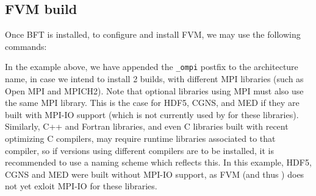 \documentclass[a4paper,10pt,twoside]{article}
\begin{document}
\subsection{FVM build\label{sec:fvm:config:examples}}

Once BFT is installed, to configure and install FVM, we may use the
following commands:


In the example above, we have appended the \texttt{\_ompi} postfix
to the architecture name, in case we intend to install 2 builds,
with different MPI libraries (such as Open MPI and MPICH2).
Note that optional libraries using MPI must also use the same MPI
library. This is the case for HDF5, CGNS, and MED if they are built
with MPI-IO support (which is not currently used by \CS for these libraries).
Similarly, C++ and Fortran libraries, and even C libraries built with recent
optimizing C compilers, may require runtime libraries associated to that
compiler, so if versions using different compilers are to be installed, it is
recommended to use a naming scheme which reflects this.
In this example, HDF5, CGNS and MED were built without MPI-IO support,
as FVM (and thus \CS) does not yet exloit MPI-IO for these libraries.
\end{document}
